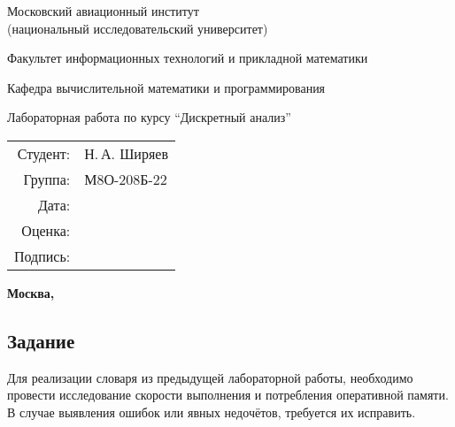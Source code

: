 \documentclass[pdf, unicode, 12pt, a4paper,oneside,fleqn]{article}
\begin{document}
    \begin{center}
    \bfseries
    
    {\Large Московский авиационный институт\\ (национальный исследовательский университет)
    
    }
    
    \vspace{48pt}
    
    {\large Факультет информационных технологий и прикладной математики
    }
    
    \vspace{36pt}
    
    {\large Кафедра вычислительной математики и программирования
    
    }
    
    
    \vspace{48pt}
    
    Лабораторная работа  по курсу \enquote{Дискретный анализ}
    
    \end{center}
    
    \vspace{72pt}
    
    \begin{flushright}
    \begin{tabular}{rl}
    Студент: & Н.\,А. Ширяев \\
    Группа: & М8О-208Б-22 \\
    Дата: & \\
    Оценка: & \\
    Подпись: & \\
    \end{tabular}
    \end{flushright}
    
    \vfill
    
    \begin{center}
    \bfseries
    Москва, \the\year
    \end{center}
    
    \pagebreak


\subsection*{Задание}
Для реализации словаря из предыдущей лабораторной работы, необходимо провести исследование скорости выполнения и потребления оперативной памяти. В случае выявления ошибок или явных недочётов, требуется их исправить.
\end{document}
